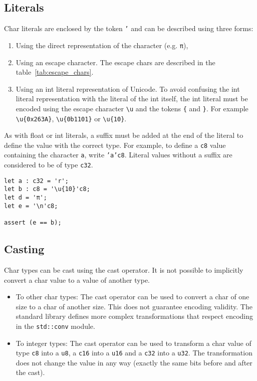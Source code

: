 \subsection{Literals}
\label{sec:org73c4919}

Char literals are enclosed by the token \texttt{'} and can be described using three forms:

\begin{enumerate}
\item Using the direct representation of the character (e.g. \texttt{π}),
\item Using an escape character. The escape chars are described in the
  table~\ref{tab:escape_chars}.

\item Using an int literal representation of Unicode. To avoid confusing the int
  literal representation with the literal of the int itself, the int literal
  must be encoded using the escape character \texttt{\textbackslash{}u} and the
  tokens \texttt{\{} and \texttt{\}}. For example
  \texttt{\textbackslash{}u\{0x263A\}}, \texttt{\textbackslash{}u\{0b1101\}} or
  \texttt{\textbackslash{}u\{10\}}.

\end{enumerate}

As with float or int literals, a suffix must be added at the end of the literal
to define the value with the correct type. For example, to define a \texttt{c8}
value containing the character \texttt{a}, write \texttt{'a'c8}. Literal values
without a suffix are considered to be of type \texttt{c32}.

\begin{lstlisting}[style=coloredverbatim]
let a : c32 = 'r';
let b : c8 = '\u{10}'c8;
let d = 'π';
let e = '\n'c8;

assert (e == b);
\end{lstlisting}

\subsection{Casting}
\label{sec:org16d703f}

Char types can be cast using the cast operator. It is not possible to implicitly convert a char value to a value of another type.

\begin{itemize}
\item To other char types: The cast operator can be used to convert a char of
  one size to a char of another size. This does not guarantee encoding validity.
  The standard library defines more complex transformations that respect
  encoding in the \texttt{std::conv} module.

\item To integer types: The cast operator can be used to transform a char value
  of type \texttt{c8} into a \texttt{u8}, a \texttt{c16} into a \texttt{u16} and
  a \texttt{c32} into a \texttt{u32}. The transformation does not change the
  value in any way (exactly the same bits before and after the cast).

\end{itemize}


